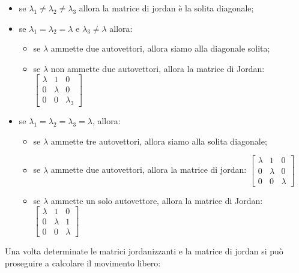     \begin{itemize}
        \item se $\lambda_1 \neq \lambda_2 \neq \lambda_3$ allora la matrice di jordan è la solita diagonale;
        \item se $\lambda_1 = \lambda_2 = \lambda$ e $\lambda_3 \neq \lambda$ allora:
        \begin{itemize}
            \item se $\lambda$ ammette due autovettori, allora siamo alla diagonale solita;
            \item se $\lambda$ non ammette due autovettori, allora la matrice di Jordan:$\left[\begin{matrix}
                \lambda & 1 & 0 \\
                0 & \lambda & 0\\
                0 & 0 & \lambda_3
            \end{matrix}\right]$
        \end{itemize}
        \item se $\lambda_1 = \lambda_2 = \lambda_3 = \lambda$, allora:
        \begin{itemize}
            \item se $\lambda$ ammette tre autovettori, allora siamo alla solita diagonale;
            \item se $\lambda$ ammette due autovettori, allora la matrice di jordan: $\left[\begin{matrix}
                \lambda & 1 & 0 \\
                0 & \lambda & 0\\
                0 & 0 & \lambda
            \end{matrix}\right]$
            \item se $\lambda$ ammette un solo autovettore, allora la matrice di Jordan: $\left[\begin{matrix}
                \lambda & 1 & 0 \\
                0 & \lambda & 1\\
                0 & 0 & \lambda
            \end{matrix}\right]$
        \end{itemize}
    \end{itemize}
    Una volta determinate le matrici jordanizzanti e la matrice di jordan si può proseguire a calcolare il movimento libero:
